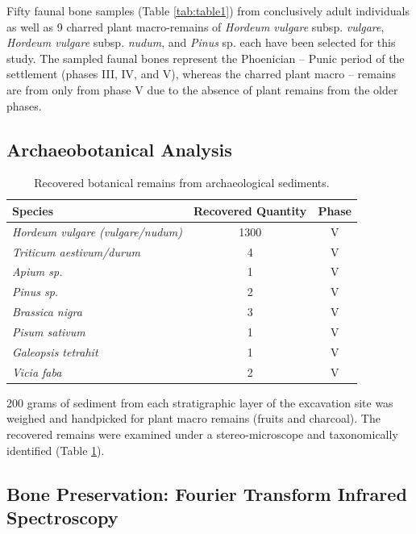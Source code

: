 \documentclass[5p]{elsarticle} %
\begin{document}
Fifty faunal bone samples (Table \ref{tab:table1}) from conclusively adult individuals as well as 9 charred plant macro-remains of \emph{Hordeum vulgare} subsp. \emph{vulgare}, \emph{Hordeum vulgare} subsp. \emph{nudum}, and \emph{Pinus} sp. each have been selected for this study. The sampled faunal bones represent the Phoenician -- Punic period of the settlement (phases III, IV, and V), whereas the charred plant macro -- remains are from only from phase V due to the absence of plant remains from the older phases.

\hypertarget{archaeobotanical-analysis}{%
\subsection{Archaeobotanical Analysis}\label{archaeobotanical-analysis}}

\begin{table}[!h]

\caption{\label{tab:table2}Recovered botanical remains from archaeological sediments.}
\centering
\fontsize{7.5}{9.5}\selectfont
\begin{tabular}[t]{>{}lcc}
\toprule
Species & Recovered Quantity & Phase\\
\midrule
\em{Hordeum vulgare (vulgare/nudum)} & 1300 & V\\
\em{Triticum aestivum/durum} & 4 & V\\
\em{Apium sp.} & 1 & V\\
\em{Pinus sp.} & 2 & V\\
\em{Brassica nigra} & 3 & V\\
\em{Pisum sativum} & 1 & V\\
\em{Galeopsis tetrahit} & 1 & V\\
\em{Vicia faba} & 2 & V\\
\bottomrule
\end{tabular}
\end{table}

200 grams of sediment from each stratigraphic layer of the excavation site was weighed and handpicked for plant macro remains (fruits and charcoal). The recovered remains were examined under a stereo-microscope and taxonomically identified (Table \ref{tab:table2}).

\hypertarget{bone-preservation-fourier-transform-infrared-spectroscopy}{%
\subsection{Bone Preservation: Fourier Transform Infrared Spectroscopy}\label{bone-preservation-fourier-transform-infrared-spectroscopy}}
\end{document}
